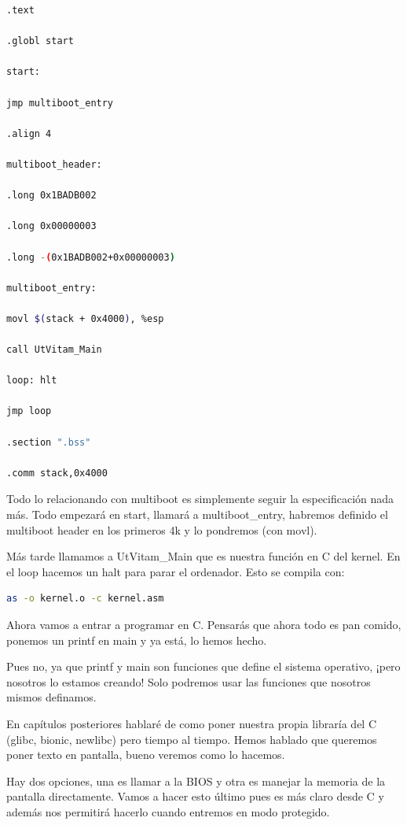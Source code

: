 \documentclass[12pt, twoside]{report}
\begin{document}
\begin{lstlisting}[language=bash]
.text

.globl start

start:

jmp multiboot_entry

.align 4

multiboot_header:

.long 0x1BADB002

.long 0x00000003

.long -(0x1BADB002+0x00000003)

multiboot_entry:

movl $(stack + 0x4000), %esp

call UtVitam_Main

loop: hlt

jmp loop

.section ".bss"

.comm stack,0x4000

\end{lstlisting}

Todo lo relacionando con multiboot es simplemente seguir la especificación nada más. Todo empezará en start, llamará a multiboot\_entry, habremos definido el multiboot header en los primeros 4k y lo pondremos (con movl).


Más tarde llamamos a UtVitam\_Main que es nuestra función en C del kernel. En el loop hacemos un halt para parar el ordenador. Esto se compila con:

\begin{lstlisting}[language=bash]
as -o kernel.o -c kernel.asm
\end{lstlisting}

Ahora vamos a entrar a programar en C. Pensarás que ahora todo es pan comido, ponemos un printf en main y ya está, lo hemos hecho.

Pues no, ya que printf y main son funciones que define el sistema operativo, ¡pero nosotros lo estamos creando! Solo podremos usar las funciones que nosotros mismos definamos.

En capítulos posteriores hablaré de como poner nuestra propia libraría del C (glibc, bionic, newlibc) pero tiempo al tiempo. Hemos hablado que queremos poner texto en pantalla, bueno veremos como lo hacemos.

Hay dos opciones, una es llamar a la BIOS y otra es manejar la memoria de la pantalla directamente. Vamos a hacer esto último pues es más claro desde C y además nos permitirá hacerlo cuando entremos en modo protegido.
\end{document}
